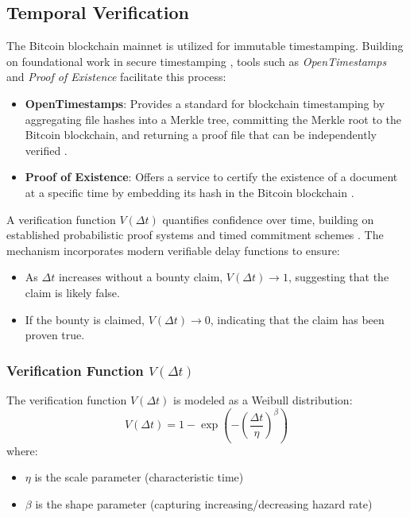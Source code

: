 \documentclass[12pt]{report}
\begin{document}
\subsection{Temporal Verification}
The Bitcoin blockchain mainnet \cite{Nakamoto2008} is utilized for immutable timestamping. Building on foundational work in secure timestamping \cite{HaberStornetta1991}, tools such as \textit{OpenTimestamps} and \textit{Proof of Existence} facilitate this process:

\begin{itemize}
    \item \textbf{OpenTimestamps}: Provides a standard for blockchain timestamping by aggregating file hashes into a Merkle tree, committing the Merkle root to the Bitcoin blockchain, and returning a proof file that can be independently verified \cite{opentimestamps}.
    \item \textbf{Proof of Existence}: Offers a service to certify the existence of a document at a specific time by embedding its hash in the Bitcoin blockchain \cite{proofofexistence}.
\end{itemize}

A verification function \( V(\Delta t) \) quantifies confidence over time, building on established probabilistic proof systems \cite{BabaiMoran1988} and timed commitment schemes \cite{BonehNaor2000}. The mechanism incorporates modern verifiable delay functions \cite{BonehBunzFisch2018} to ensure:

\begin{itemize}
    \item As \( \Delta t \) increases without a bounty claim, \( V(\Delta t) \rightarrow 1 \), suggesting that the claim is likely false.
    \item If the bounty is claimed, \( V(\Delta t) \rightarrow 0 \), indicating that the claim has been proven true.
\end{itemize}

\subsubsection{Verification Function \( V(\Delta t) \)}
The verification function \( V(\Delta t) \) is modeled as a Weibull distribution:
\begin{equation}
    V(\Delta t) = 1 - \exp\left(-\left(\frac{\Delta t}{\eta}\right)^\beta\right)
\end{equation}
where:
\begin{itemize}
    \item \(\eta\) is the scale parameter (characteristic time)
    \item \(\beta\) is the shape parameter (capturing increasing/decreasing hazard rate)
\end{itemize}
\end{document}
